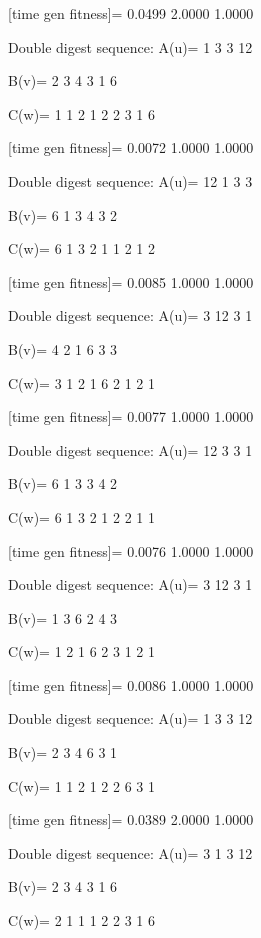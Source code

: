 [time gen fitness]=
    0.0499    2.0000    1.0000

Double digest sequence:
A(u)=
     1     3     3    12

B(v)=
     2     3     4     3     1     6

C(w)=
     1     1     2     1     2     2     3     1     6

[time gen fitness]=
    0.0072    1.0000    1.0000

Double digest sequence:
A(u)=
    12     1     3     3

B(v)=
     6     1     3     4     3     2

C(w)=
     6     1     3     2     1     1     2     1     2

[time gen fitness]=
    0.0085    1.0000    1.0000

Double digest sequence:
A(u)=
     3    12     3     1

B(v)=
     4     2     1     6     3     3

C(w)=
     3     1     2     1     6     2     1     2     1

[time gen fitness]=
    0.0077    1.0000    1.0000

Double digest sequence:
A(u)=
    12     3     3     1

B(v)=
     6     1     3     3     4     2

C(w)=
     6     1     3     2     1     2     2     1     1

[time gen fitness]=
    0.0076    1.0000    1.0000

Double digest sequence:
A(u)=
     3    12     3     1

B(v)=
     1     3     6     2     4     3

C(w)=
     1     2     1     6     2     3     1     2     1

[time gen fitness]=
    0.0086    1.0000    1.0000

Double digest sequence:
A(u)=
     1     3     3    12

B(v)=
     2     3     4     6     3     1

C(w)=
     1     1     2     1     2     2     6     3     1

[time gen fitness]=
    0.0389    2.0000    1.0000

Double digest sequence:
A(u)=
     3     1     3    12

B(v)=
     2     3     4     3     1     6

C(w)=
     2     1     1     1     2     2     3     1     6

